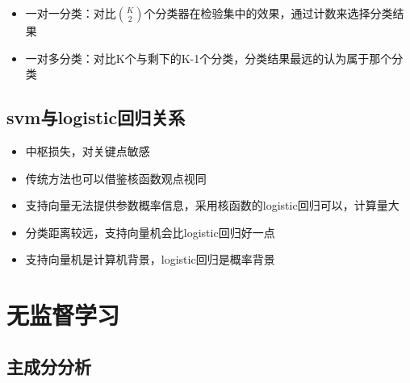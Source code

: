 \documentclass[]{book}
\providecommand{\tightlist}{%
  \setlength{\itemsep}{0pt}\setlength{\parskip}{0pt}}
\begin{document}
\begin{itemize}
\tightlist
\item
  一对一分类：对比\(K \choose 2\)个分类器在检验集中的效果，通过计数来选择分类结果
\item
  一对多分类：对比K个与剩下的K-1个分类，分类结果最远的认为属于那个分类
\end{itemize}

\hypertarget{svmlogistic}{%
\subsection{svm与logistic回归关系}\label{svmlogistic}}

\begin{itemize}
\tightlist
\item
  中枢损失，对关键点敏感
\item
  传统方法也可以借鉴核函数观点视同
\item
  支持向量无法提供参数概率信息，采用核函数的logistic回归可以，计算量大
\item
  分类距离较远，支持向量机会比logistic回归好一点
\item
  支持向量机是计算机背景，logistic回归是概率背景
\end{itemize}

\section{无监督学习}

\subsection{主成分分析}
\end{document}
